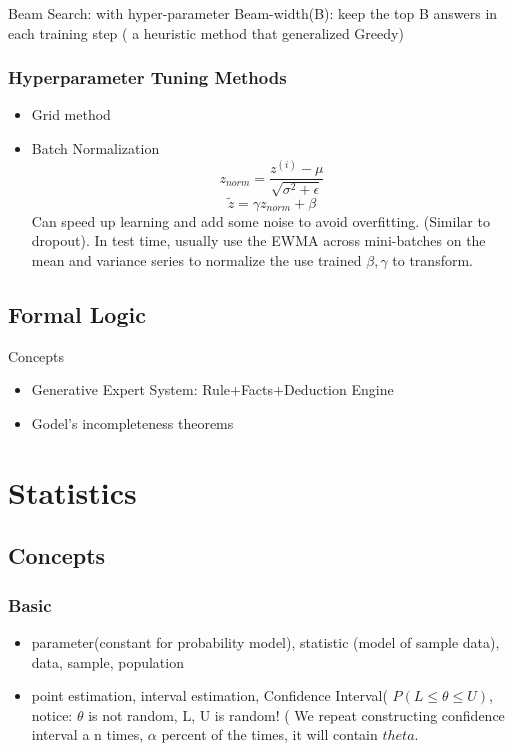 \documentclass[11pt, openany]{book}              %
\begin{document}
Beam Search: with hyper-parameter Beam-width(B): keep the top B answers in each training step ( a heuristic method that generalized Greedy)

\subsection{Hyperparameter Tuning Methods}

\begin{itemize}
	\item Grid method 
	\item Batch Normalization 
	$$z_{norm} = \frac{z^{(i)}-\mu}{\sqrt{\sigma^2 + \epsilon}}$$
	$$\tilde{z} = \gamma z_{norm}  + \beta$$
	Can speed up learning and add some noise to avoid overfitting. (Similar to dropout).
	In test time, usually use the EWMA across mini-batches on the mean and variance series to normalize the use trained $\beta, \gamma$ to transform. 
\end{itemize}

\section{Formal Logic}

Concepts
\begin{itemize}
    \item Generative Expert System: Rule+Facts+Deduction Engine 
    \item Godel's incompleteness theorems
\end{itemize}

\chapter{Statistics}

\section{Concepts}
\subsection{Basic}
\begin{itemize}
    \item parameter(constant for probability model), statistic (model of sample data), data, sample, population
    \item point estimation, interval estimation, Confidence Interval( $P(L \leq \theta \leq U )$, notice: $\theta$ is not random, L, U is random! ( We repeat constructing confidence interval a n times, $\alpha$ percent of the times, it will contain $theta$.
\end{itemize}
\end{document}
